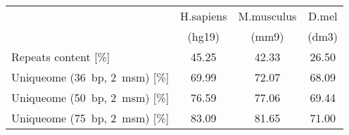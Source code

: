\begin{table}[h]
    \begin{tabular}{lccc}
    \toprule
    ~                                        & H.sapiens & M.musculus & D.mel \\
    ~                                        & (hg19) & (mm9) & (dm3) \\
    \midrule
    Repeats content [\%]               & 45.25            & 42.33            & 26.50      \\
    \midrule
    Uniqueome (36~bp, 2~msm) [\%]               & 69.99            & 72.07            & 68.09      \\
    Uniqueome (50~bp, 2~msm) [\%]               & 76.59            & 77.06            & 69.44      \\
    Uniqueome (75~bp, 2~msm) [\%]               & 83.09            & 81.65            & 71.00      \\
    \bottomrule
    \end{tabular}
\end{table}
